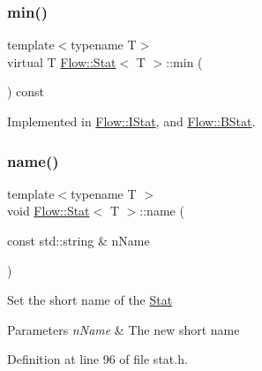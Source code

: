 \hypertarget{class_flow_1_1_stat_a7cf2be39e64fb4da988b604b92a85d28}{}\label{class_flow_1_1_stat_a7cf2be39e64fb4da988b604b92a85d28} 
\subsubsection{\texorpdfstring{min()}{min()}}
{\footnotesize\ttfamily template$<$typename T$>$ \\
virtual T \hyperlink{class_flow_1_1_stat}{Flow\+::\+Stat}$<$ T $>$\+::min (\begin{DoxyParamCaption}{ }\end{DoxyParamCaption}) const\hspace{0.3cm}{\ttfamily [pure virtual]}}



Implemented in \hyperlink{class_flow_1_1_i_stat_a50cce8b3e14125d89165bce7cc9666ee}{Flow\+::\+I\+Stat}, and \hyperlink{class_flow_1_1_b_stat_a815c577e96e80df05112d5e7928789c1}{Flow\+::\+B\+Stat}.

\hypertarget{class_flow_1_1_stat_acb4d3c7aeaf3e74166dcf3ae8bae623c}{}\label{class_flow_1_1_stat_acb4d3c7aeaf3e74166dcf3ae8bae623c} 
\subsubsection{\texorpdfstring{name()}{name()}\hspace{0.1cm}{\footnotesize\ttfamily [1/2]}}
{\footnotesize\ttfamily template$<$typename T $>$ \\
void \hyperlink{class_flow_1_1_stat}{Flow\+::\+Stat}$<$ T $>$\+::name (\begin{DoxyParamCaption}\item[{const std\+::string \&}]{n\+Name }\end{DoxyParamCaption})}

Set the short name of the \hyperlink{class_flow_1_1_stat}{Stat} 
\begin{DoxyParams}{Parameters}
{\em n\+Name} & The new short name \\
\hline
\end{DoxyParams}


Definition at line 96 of file stat.\+h.

\hypertarget{class_flow_1_1_stat_a189a887c27df8b70987df310cee98337}{}\label{class_flow_1_1_stat_a189a887c27df8b70987df310cee98337} 
